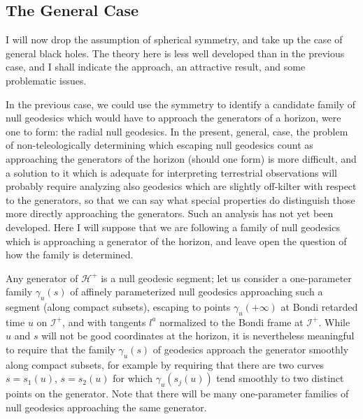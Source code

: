 \documentclass[
%
draft    %
,numberedheadings 
,bibliocites
  ]
  {aipproc}
\newcommand{\scrif}{{{\mathscr I}^{+}}}
\newcommand{\Hf}{{{\mathscr H}^{+}}} %
\begin{document}
\subsection{The General Case}

I will now drop the assumption of spherical symmetry, and take up the case of general black holes.  The theory here is less well developed than in the previous case, and I shall indicate the approach, an attractive result, and some problematic issues.

In the previous case, we could use the symmetry to identify a candidate family of null geodesics which would have to approach the generators of a horizon, were one to form:  the radial null geodesics.
In the present, general, case, the problem of non-teleologically determining which escaping null geodesics count as approaching the generators of the horizon (should one form) is more difficult, and a solution to it which is adequate for interpreting 
terrestrial observations will probably require analyzing also 
geodesics which are slightly off-kilter with respect to the 
generators, so that we can say what special properties do 
distinguish those more directly approaching the generators.
Such an analysis has not yet been developed.  Here I will 
suppose that we are following a family of null geodesics which is 
approaching a generator of the horizon, and leave open the 
question of how the family is determined.

Any generator of $\Hf$ is a null geodesic segment; let us consider a one-parameter family $\gamma _u(s)$ of affinely parameterized null geodesics approaching such a segment (along compact subsets), escaping to points $\gamma _u(+\infty )$ at Bondi retarded time $u$ on $\scrif$, and with tangents $l^a$ normalized to the Bondi frame at $\scrif$.
While $u$ and $s$ will not be good coordinates at the horizon, it is nevertheless meaningful to require that the family $\gamma _u(s)$ of geodesics approach the generator smoothly along compact subsets, for example by requiring that there are two curves $s=s_1(u)$, $s=s_2(u)$ for which $\gamma _u(s_j(u))$ tend smoothly to two distinct points on the generator.
Note that there will be many one-parameter families of null geodesics approaching the same generator.
\end{document}
